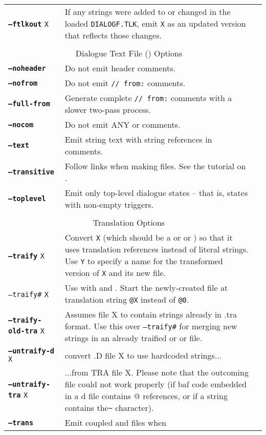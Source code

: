 \documentclass{article}
\def\ttref#1{\ahrefloc{#1}{\tt #1}}
\def\DEFINE#1{{\tt \bf #1}\label{#1}\index{#1}}
\def\t#1{{\tt #1}}
\begin{document}
\begin{tabular}{lp{10in}|p{10in}}
\DEFINE{--ftlkout} \t{X} & If any strings were added to or changed in the
loaded \t{DIALOGF.TLK}, emit \t{X} as an updated version that reflects
those changes. \\
\\
\multicolumn{2}{c}{ \color{red} Dialogue Text File (\ttref{D}) Options} \\
\DEFINE{--noheader} &	Do not emit \ttref{D} header comments. \\
\DEFINE{--nofrom} &	Do not emit \ttref{D} {\tt // from:} comments. \\
\DEFINE{--full-from} &  Generate complete {\tt // from:} comments with a
slower two-pass process. \\
\DEFINE{--nocom} & Do not emit ANY \ttref{D} or \ttref{BAF} comments. \\
\DEFINE{--text} & Emit string text with string references in comments. \\
\DEFINE{--transitive} & Follow \ttref{EXTERN} links when making \ttref{D}
files. See the tutorial on \ttref{--transitive}. \\
\DEFINE{--toplevel} & Emit only top-level dialogue states -- that is,
states with non-empty triggers. \\ 
\\
\multicolumn{2}{c}{ \color{red} Translation Options} \\
\DEFINE{--traify} \t{X} & Convert \t{X} (which should be a \ttref{D} or \ttref{TP2} or \ttref{BAF}) so that it uses translation references instead of literal strings. Use \ttref{--out} \t{Y} to specify a name for the transformed version of \t{X} and its new \ttref{TRA} file. \\
\t{--traify\#} \t{X} &	Use with \ttref{--traify} and \ttref{--traify-tlk}. Start the newly-created \ttref{TRA} file at translation string {\tt @X} instead of {\tt @0}. \\
\DEFINE{--traify-old-tra} \t{X} & Assumes file X to contain strings already in .tra format.
Use this over \t{--traify\#} for merging new strings in an already traified \ttref{D} or \ttref{TP2} or \ttref{BAF} file.
\\
\DEFINE{--untraify-d} \t{X} & convert .D file X to use hardcoded strings... \\
\DEFINE{--untraify-tra} \t{X} & ...from TRA file X. Please note that the outcoming file
  could not work properly (if baf code embedded in a d file contains @ references, or if a string contains
  the\verb+~+ character). \\
\DEFINE{--trans} & Emit coupled \ttref{D} and \ttref{TRA} files when

\end{tabular}
\end{document}
